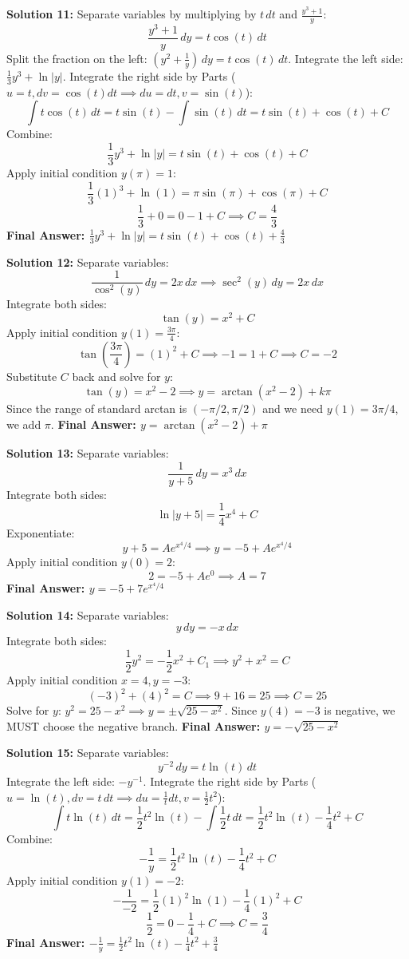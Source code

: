 \documentclass[11pt]{article}
\begin{document}
\textbf{Solution 11:}
Separate variables by multiplying by $t \, dt$ and $\frac{y^3+1}{y}$:
\[ \frac{y^3+1}{y} \, dy = t \cos(t) \, dt \]
Split the fraction on the left: $(y^2 + \frac{1}{y}) \, dy = t \cos(t) \, dt$.
Integrate the left side: $\frac{1}{3}y^3 + \ln|y|$.
Integrate the right side by Parts ($u = t, dv = \cos(t) dt \implies du = dt, v = \sin(t)$):
\[ \int t \cos(t) \, dt = t\sin(t) - \int \sin(t) \, dt = t\sin(t) + \cos(t) + C \]
Combine:
\[ \frac{1}{3}y^3 + \ln|y| = t\sin(t) + \cos(t) + C \]
Apply initial condition $y(\pi) = 1$:
\[ \frac{1}{3}(1)^3 + \ln(1) = \pi\sin(\pi) + \cos(\pi) + C \]
\[ \frac{1}{3} + 0 = 0 - 1 + C \implies C = \frac{4}{3} \]
\textbf{Final Answer: $\frac{1}{3}y^3 + \ln|y| = t\sin(t) + \cos(t) + \frac{4}{3}$}

\textbf{Solution 12:}
Separate variables:
\[ \frac{1}{\cos^2(y)} \, dy = 2x \, dx \implies \sec^2(y) \, dy = 2x \, dx \]
Integrate both sides:
\[ \tan(y) = x^2 + C \]
Apply initial condition $y(1) = \frac{3\pi}{4}$:
\[ \tan\left(\frac{3\pi}{4}\right) = (1)^2 + C \implies -1 = 1 + C \implies C = -2 \]
Substitute $C$ back and solve for $y$:
\[ \tan(y) = x^2 - 2 \implies y = \arctan(x^2 - 2) + k\pi \]
Since the range of standard arctan is $(-\pi/2, \pi/2)$ and we need $y(1) = 3\pi/4$, we add $\pi$.
\textbf{Final Answer: $y = \arctan(x^2 - 2) + \pi$}

\textbf{Solution 13:}
Separate variables:
\[ \frac{1}{y+5} \, dy = x^3 \, dx \]
Integrate both sides:
\[ \ln|y+5| = \frac{1}{4}x^4 + C \]
Exponentiate:
\[ y + 5 = A e^{x^4/4} \implies y = -5 + A e^{x^4/4} \]
Apply initial condition $y(0) = 2$:
\[ 2 = -5 + A e^0 \implies A = 7 \]
\textbf{Final Answer: $y = -5 + 7e^{x^4/4}$}

\textbf{Solution 14:}
Separate variables:
\[ y \, dy = -x \, dx \]
Integrate both sides:
\[ \frac{1}{2}y^2 = -\frac{1}{2}x^2 + C_1 \implies y^2 + x^2 = C \]
Apply initial condition $x = 4, y = -3$:
\[ (-3)^2 + (4)^2 = C \implies 9 + 16 = 25 \implies C = 25 \]
Solve for $y$: $y^2 = 25 - x^2 \implies y = \pm\sqrt{25-x^2}$.
Since $y(4) = -3$ is negative, we MUST choose the negative branch.
\textbf{Final Answer: $y = -\sqrt{25-x^2}$}

\textbf{Solution 15:}
Separate variables:
\[ y^{-2} \, dy = t \ln(t) \, dt \]
Integrate the left side: $-y^{-1}$.
Integrate the right side by Parts ($u = \ln(t), dv = t \, dt \implies du = \frac{1}{t} dt, v = \frac{1}{2}t^2$):
\[ \int t \ln(t) \, dt = \frac{1}{2}t^2 \ln(t) - \int \frac{1}{2}t \, dt = \frac{1}{2}t^2 \ln(t) - \frac{1}{4}t^2 + C \]
Combine:
\[ -\frac{1}{y} = \frac{1}{2}t^2 \ln(t) - \frac{1}{4}t^2 + C \]
Apply initial condition $y(1) = -2$:
\[ -\frac{1}{-2} = \frac{1}{2}(1)^2 \ln(1) - \frac{1}{4}(1)^2 + C \]
\[ \frac{1}{2} = 0 - \frac{1}{4} + C \implies C = \frac{3}{4} \]
\textbf{Final Answer: $-\frac{1}{y} = \frac{1}{2}t^2 \ln(t) - \frac{1}{4}t^2 + \frac{3}{4}$}
\end{document}
